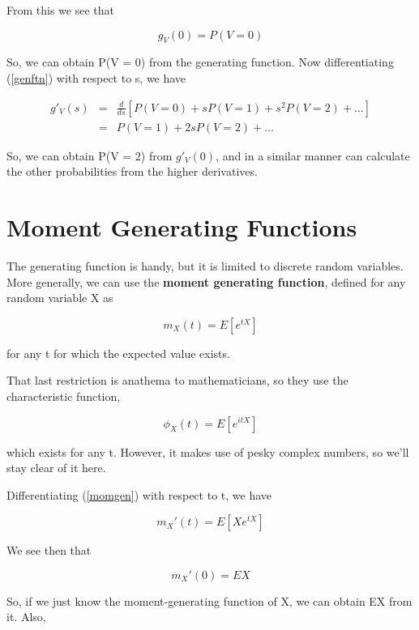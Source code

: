From this we see that 

\begin{equation}
g_V(0) = P(V = 0)
\end{equation}

So, we can obtain P(V = 0) from the generating function.  Now
differentiating (\ref{genftn}) with respect to s, we have

\begin{eqnarray}
g'_V(s) &=&
\frac{d}{ds} \left [ P(V=0) + s P(V=1) + s^2 P(V=2) + ...  \right ]
\nonumber \\
&=&
P(V=1) + 2s P(V=2) + ...  
\end{eqnarray}

So, we can obtain P(V = 2) from $g'_V(0)$, and in a similar manner can
calculate the other probabilities from the higher derivatives.

\section{Moment Generating Functions}

The generating function is handy, but it is limited to discrete random
variables.  More generally, we can use the {\bf moment generating
function}, defined for any random variable X as

\begin{equation}
\label{momgen}
m_X(t) = E[e^{tX}] 
\end{equation}

for any t for which the expected value exists.

That last restriction is anathema to mathematicians, so they use the
characteristic function, 

\begin{equation}
\phi_X(t) = E[e^{itX}] 
\end{equation}

which exists for any t.  However, it makes use of pesky complex numbers,
so we'll stay clear of it here.

Differentiating (\ref{momgen}) with respect to t, we have

\begin{equation}
m_X'(t) = E[X e^{tX}] 
\end{equation}

We see then that

\begin{equation}
m_X'(0) = EX
\end{equation}

So, if we just know the moment-generating function of X, we can obtain
EX from it.  Also,

